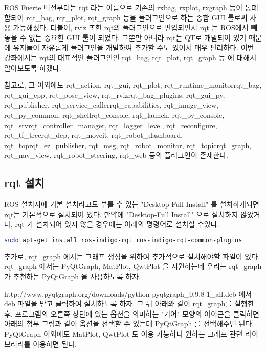 ROS Fuerte 버전부터는 rqt 라는 이름으로 기존의 rxbag, rxplot, rxgraph 등이 통폐합되어 rqt\_bag, rqt\_plot, rqt\_graph 등을 플러그인으로 하는 종합 GUI 툴로써 사용 가능해졌다. 더불어, rviz 또한 rqt의 플러그인으로 편입되면서 rqt 는 ROS에서 빼놓을 수 없는 중요한 GUI 툴이 되었다. 그뿐만 아니라 rqt는 QT로 개발되어 있기 때문에 유저들이 자유롭게 플러그인을 개발하여 추가할 수도 있어서 매우 편리하다. 이번 강좌에서는 rqt의 대표적인 플러그인인 rqt\_bag, rqt\_plot, rqt\_graph 등 에 대해서 알아보도록 하겠다.

참고로, 그 이외에도 rqt\_action, rqt\_gui, rqt\_plot, rqt\_runtime\_monitorrqt\_bag, rqt\_gui\_cpp, rqt\_pose\_view, rqt\_rvizrqt\_bag\_plugins, rqt\_gui\_py, rqt\_publisher, rqt\_service\_callerrqt\_capabilities, rqt\_image\_view, rqt\_py\_common, rqt\_shellrqt\_console, rqt\_launch, rqt\_py\_console, rqt\_srvrqt\_controller\_manager, rqt\_logger\_level, rqt\_reconfigure, rqt\_tf\_treerqt\_dep, rqt\_moveit, rqt\_robot\_dashboard, rqt\_toprqt\_ez\_publisher, rqt\_msg, rqt\_robot\_monitor, rqt\_topicrqt\_graph, rqt\_nav\_view, rqt\_robot\_steering, rqt\_web 등의 플러그인이 존재한다.\sloppy

\subsection{rqt 설치}

ROS 설치시에 기본 설치라고도 부를 수 있는 "Desktop-Full Install" 를 설치하게되면 rqt는 기본적으로 설치되어 있다. 만약에 "Desktop-Full Install" 으로 설치하지 않았거나, rqt 가 설치되어 있지 않을 경우에는 아래의 명령어로 설치할 수있다.

\begin{lstlisting}[language=bash]
sudo apt-get install ros-indigo-rqt ros-indigo-rqt-common-plugins
\end{lstlisting}

추가로, rqt\_graph 에서는 그래프 생성을 위하여 추가적으로 설치해야할 파일이 있다. rqt\_graph 에서는 PyQtGraph, MatPlot, QwtPlot 을 지원하는데 우리는 rqt\_graph 가 추천하는 PyQtGraph 을 사용하도록 하자.

http://www.pyqtgraph.org/downloads/python-pyqtgraph\_0.9.8-1\_all.deb 에서 deb 파일을 받고 클릭하여 설치하도록 하자. 그 뒤 아래와 같이 rqt\_graph를 실행한 후, 프로그램의 오른쪽 상단에 있는 옵션을 의미하는 "기어" 모양의 아이콘을 클릭하면 아래의 첨부 그림과 같이 옵션을 선택할 수 있는데 PyQtGraph 를 선택해주면 된다. PyQtGraph 이외에도 MatPlot, QwtPlot 도 이용 가능하니 원하는 그래프 관련 라이브러리를 이용하면 된다.


